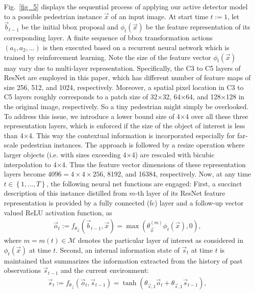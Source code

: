 \documentclass[10pt,journal,compsoc,twoside]{IEEEtran}
\begin{document}
Fig.~\ref{fig_5} displays the sequential process of applying our active detector model to a possible pedestrian instance $\vec{x}$ of an input image.
At start time $t:=1$, let $\vec{b}_{t-1}$  be the initial bbox proposal and $\phi_t \left(\vec{x}\right)$ be the feature representation of its corresponding layer.
A finite sequence of bbox transformation actions $\left(a_1, a_2, \ldots \right)$ is then executed based on a recurrent neural network which is trained by reinforcement learning. Note the size of the feature vector $\phi_t \left(\vec{x}\right)$ may vary due to multi-layer representation.
Specifically, the C3 to C5 layers of ResNet are employed in this paper, which has different number of feature maps of size 256, 512, and 1024, respectively. Moreover, a spatial pixel location in C3 to C5 layers roughly corresponds to a patch size of 32$\times$32, 64$\times$64, and 128$\times$128 in the original image, respectively. So a tiny pedestrian might simply be overlooked. To address this issue, we introduce a lower bound size of 4$\times$4 over all these three representation layers, which is enforced if the size of the object of interest is less than 4$\times$4. This way the contextual information is incorporated especially for far-scale pedestrian instances. The approach is followed by a resize operation where larger objects (i.e. with sizes exceeding 4$\times$4) are rescaled with bicubic interpolation to 4$\times$4. Thus the feature vector dimensions of these representation layers become $4096=4\times4\times256$, 8192, and 16384, respectively.
Now, at any time $t \in \left\{1,\ldots, T\right\}$, the following neural net functions are engaged:
First, a succinct description of this instance distilled from $m$-th layer of its ResNet feature representation is provided by a fully connected (fc) layer and a follow-up vector valued ReLU activation function, as
\begin{align}
\label{eq_ot}
\vec{o}_t := f_{\theta_{\vec{o}}}\left( \vec{b}_{t-1}, \vec{x} \right) = \max \left( \theta_{\vec{o}}^{(m)} \phi_t \left(\vec{x}\right), 0 \right),
\end{align}
where $m = m(t) \in \mathcal{M}$ denotes the particular layer of interest as considered in $\phi_t \left(\vec{x}\right)$ at time $t$.
Second, an internal information state of $\vec{s}_t$ at time $t$ is maintained that summarizes the information extracted from the history of past observations $\vec{s}_{t-1}$ and the current environment:
\begin{align}
\label{eq_st}
\vec{s}_t := f_{\theta_{\vec{s}}}\left( \vec{o}_t, \vec{s}_{t-1} \right) = \tanh \left( \theta_{\vec{s},1} \vec{o}_t + \theta_{\vec{s},1} \vec{s}_{t-1} \right),
\end{align}
\end{document}
